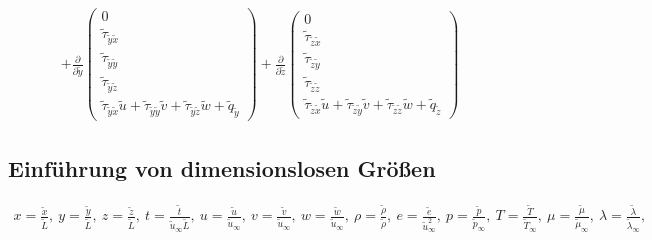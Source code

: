 \begin{align*}
+\frac{\partial}{\partial \tilde{y}}
\begin{pmatrix}
0
\\
\tilde{\tau}_{\tilde{y}\tilde{x}}
\\
\tilde{\tau}_{\tilde{y}\tilde{y}}
\\
\tilde{\tau}_{\tilde{y}\tilde{z}}
\\
\tilde{\tau}_{\tilde{y}\tilde{x}}\tilde{u}+\tilde{\tau}_{\tilde{y}\tilde{y}}\tilde{v}+\tilde{\tau}_{\tilde{y}\tilde{z}}\tilde{w}+\tilde{q}_{\tilde{y}}
\end{pmatrix}
+
\frac{\partial}{\partial \tilde{z}}
\begin{pmatrix}
0
\\
\tilde{\tau}_{\tilde{z}\tilde{x}}
\\
\tilde{\tau}_{\tilde{z}\tilde{y}}
\\
\tilde{\tau}_{\tilde{z}\tilde{z}}
\\
\tilde{\tau}_{\tilde{z}\tilde{x}}\tilde{u}+\tilde{\tau}_{\tilde{z}\tilde{y}}\tilde{v}+\tilde{\tau}_{\tilde{z}\tilde{z}}\tilde{w}+\tilde{q}_{\tilde{z}}
\end{pmatrix}
\end{align*}


\subsection{Einführung von dimensionslosen Größen}
\begin{align*}
x=\frac{\tilde{x}}{\tilde{L}},\ 
y=\frac{\tilde{y}}{\tilde{L}},\ 
z=\frac{\tilde{z}}{\tilde{L}},\ 
t=\frac{\tilde{t}}{\tilde{u}_\infty \tilde{L}},\ 
u=\frac{\tilde{u}}{\tilde{u}_\infty},\
v=\frac{\tilde{v}}{\tilde{u}_\infty},\ 
w=\frac{\tilde{w}}{\tilde{u}_\infty},\  
\rho=\frac{\tilde{\rho}}{\tilde{\rho}},\ 
e=\frac{\tilde{e}}{\tilde{u}_\infty^2},\ 
p=\frac{\tilde{p}}{\tilde{p}_\infty},\ 
T=\frac{\tilde{T}}{\tilde{T}_\infty},\
\mu=\frac{\tilde{\mu}}{\tilde{\mu}_\infty},\ 
\lambda=\frac{\tilde{\lambda}}{\tilde{\lambda}_\infty},\  
\end{align*}



